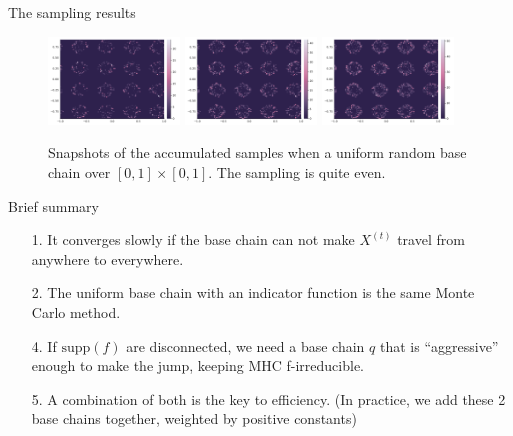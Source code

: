 \documentclass[11pt]{beamer}
\begin{document}
    \begin{frame}{The sampling results}
        \begin{figure}[h]
            \centering
            \includegraphics[width=3.5cm]{uniform_base(1).png}
            \includegraphics[width=3.5cm]{uniform_base(2).png}
            \includegraphics[width=3.5cm]{uniform_base(3).png}
            \caption{Snapshots of the accumulated samples when a uniform random base chain over $[0, 1]\times [0, 1]$. The sampling is quite even.} 
        \end{figure}
    \end{frame}
    \begin{frame}{Brief summary}
        \begin{itemize}
            \item [1.] It converges slowly if the base chain can not make $X^{(t)}$ travel from anywhere to everywhere. 
            \item [2.] The uniform base chain with an indicator function is the same Monte Carlo method. 
            \item [4.] If $\text{supp}(f)$ are disconnected, we need a base chain $q$ that is ``aggressive'' enough to make the jump, keeping MHC f-irreducible. 
            \item [5.] A combination of both is the key to efficiency. (In practice, we add these 2 base chains together, weighted by positive constants)
        \end{itemize}
    \end{frame}
\end{document}
